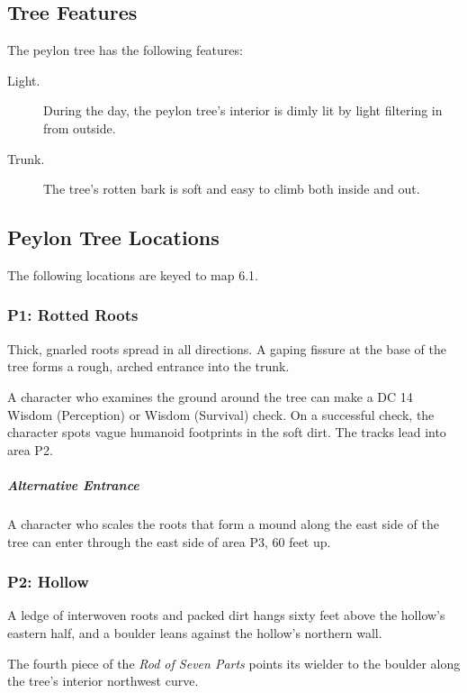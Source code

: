 \documentclass[10pt,a4paper,twoside,bg=print,twocolumn,openany,nodeprecatedcode]{dndbook}
\begin{document}
\subsection{Tree Features}
The peylon tree has the following features:


\begin{description}
\item[Light.]
During the day, the peylon tree's interior is dimly lit by light filtering in from outside.
\item[Trunk.]
The tree's rotten bark is soft and easy to climb both inside and out.
\end{description}

\subsection{Peylon Tree Locations}
The following locations are keyed to map 6.1.

\subsubsection{P1: Rotted Roots}
\begin{DndReadAloud}{}
Thick, gnarled roots spread in all directions. A gaping fissure at the base of the tree forms a rough, arched entrance into the trunk.

\end{DndReadAloud}

A character who examines the ground around the tree can make a DC 14 Wisdom (Perception) or Wisdom (Survival) check. On a successful check, the character spots vague humanoid footprints in the soft dirt. The tracks lead into area P2.

\subparagraph{Alternative Entrance}
A character who scales the roots that form a mound along the east side of the tree can enter through the east side of area P3, 60 feet up.

\subsubsection{P2: Hollow}
\begin{DndReadAloud}{}
A ledge of interwoven roots and packed dirt hangs sixty feet above the hollow's eastern half, and a boulder leans against the hollow's northern wall.

\end{DndReadAloud}

The fourth piece of the \textit{Rod of Seven Parts} points its wielder to the boulder along the tree's interior northwest curve.
\end{document}
